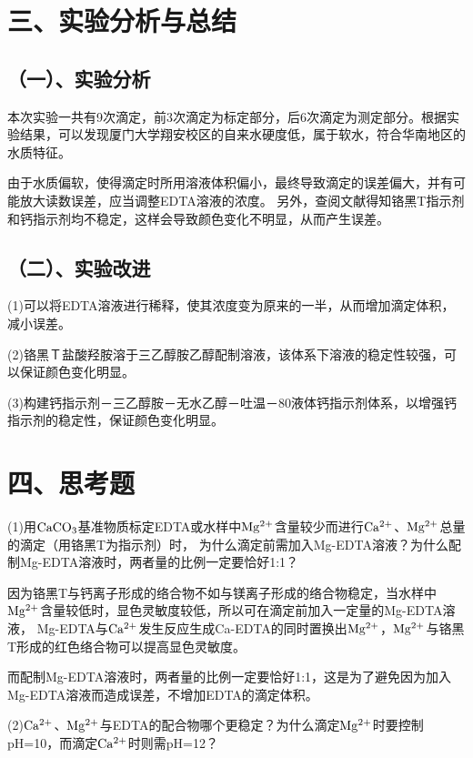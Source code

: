 \documentclass[a4paper,12pt]{article}
\begin{document}
\section*{三、实验分析与总结}
\subsection*{（一）、实验分析}
本次实验一共有9次滴定，前3次滴定为标定部分，后6次滴定为测定部分。根据实验结果，可以发现厦门大学翔安校区的自来水硬度低，属于软水，符合华南地区的水质特征。

由于水质偏软，使得滴定时所用溶液体积偏小，最终导致滴定的误差偏大，并有可能放大读数误差，应当调整EDTA溶液的浓度。
另外，查阅文献得知铬黑T指示剂和钙指示剂均不稳定\textsuperscript{\cite{GZHA201418029}}\textsuperscript{\cite{SDHG200907005}}，这样会导致颜色变化不明显，从而产生误差。

\subsection*{（二）、实验改进}
(1)可以将EDTA溶液进行稀释，使其浓度变为原来的一半，从而增加滴定体积，减小误差。

(2)铬黑Ｔ盐酸羟胺溶于三乙醇胺乙醇配制溶液，该体系下溶液的稳定性较强，可以保证颜色变化明显\textsuperscript{\cite{SDHG200907005}}。

(3)构建钙指示剂－三乙醇胺－无水乙醇－吐温－80液体钙指示剂体系，以增强钙指示剂的稳定性，保证颜色变化明显\textsuperscript{\cite{GZHA201418029}}。

\section*{四、思考题}

(1)用$\rm CaCO_3$基准物质标定EDTA或水样中$\rm Mg^{2+}$含量较少而进行$\rm Ca^{2+}$、$\rm Mg^{2+}$总量的滴定（用铬黑T为指示剂）时，
为什么滴定前需加入Mg-EDTA溶液？为什么配制Mg-EDTA溶液时，两者量的比例一定要恰好1:1？

因为铬黑T与钙离子形成的络合物不如与镁离子形成的络合物稳定，当水样中$\rm Mg^{2+}$含量较低时，显色灵敏度较低，所以可在滴定前加入一定量的Mg-EDTA溶液，
Mg-EDTA与$\rm Ca^{2+}$发生反应生成Ca-EDTA的同时置换出$\rm Mg^{2+}$，$\rm Mg^{2+}$与铬黑T形成的红色络合物可以提高显色灵敏度。

而配制Mg-EDTA溶液时，两者量的比例一定要恰好1:1，这是为了避免因为加入Mg-EDTA溶液而造成误差，不增加EDTA的滴定体积。


(2)$\rm Ca^{2+}$、$\rm Mg^{2+}$与EDTA的配合物哪个更稳定？为什么滴定$\rm Mg^{2+}$时要控制pH=10，而滴定$\rm Ca^{2+}$时则需pH=12？
\end{document}
